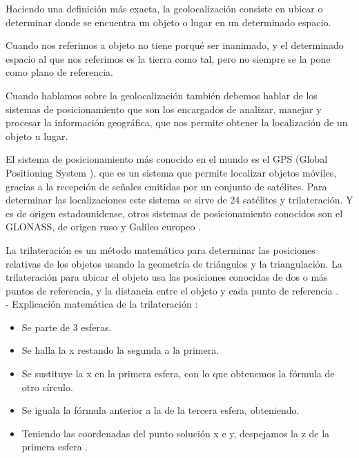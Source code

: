 Haciendo una definición más exacta, la geolocalización consiste en ubicar o determinar donde se encuentra un objeto o lugar en un determinado espacio.

Cuando nos referimos a objeto no tiene porqué ser inanimado, y el determinado espacio al que nos referimos es la tierra como tal, pero no siempre se la pone como plano de referencia. 

Cuando hablamos sobre la geolocalización también debemos hablar de los sistemas de posicionamiento que son los encargados de analizar, manejar y procesar la información geográfica, que nos permite obtener la localización de un objeto u lugar.

El sistema de posicionamiento más conocido en el mundo es el GPS (Global Positioning System ), que es un sistema que permite localizar objetos móviles, gracias a la recepción de señales emitidas por un conjunto de satélites. Para determinar las localizaciones este sistema se sirve de 24 satélites y trilateración. Y es de origen estadounidense, otros sistemas de posicionamiento conocidos son el GLONASS, de origen ruso y Galileo europeo \cite{wikigps}.

La trilateración es un método matemático para determinar las posiciones relativas de los objetos usando la geometría de triángulos y la triangulación. La trilateración para ubicar el objeto usa las posiciones conocidas de dos o más puntos de referencia, y la distancia entre el objeto y cada punto de referencia \cite{wikitrila}.
\\
- Explicación matemática de la trilateración \cite{wikitrila}:
\begin{itemize}
\item 
	Se parte de 3 esferas.
	\\
\item
	Se halla la x restando la segunda a la primera.
\item
	Se sustituye la x en la primera esfera, con lo que obtenemos la fórmula de otro círculo.
\item
	Se iguala la fórmula anterior a la de la tercera esfera, obteniendo.
\item
	Teniendo las coordenadas del punto solución x e y, despejamos la z de la primera esfera .
\end{itemize}

